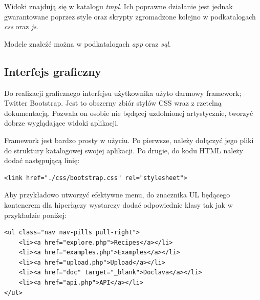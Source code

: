 \documentclass[11pt,a4paper,polish,thesis]{dcsbook}
\begin{document}
Widoki znajdują się w katalogu \emph{tmpl}. Ich poprawne działanie jest jednak gwarantowane poprzez style oraz skrypty zgromadzone kolejno w podkatalogach
\emph{css} oraz \emph{js}.

Modele znaleźć można w podkatalogach \emph{app} oraz \emph{sql}.

\subsection{Interfejs graficzny}
Do realizacji graficznego interfejsu użytkownika użyto darmowy framework; Twitter Bootstrap. Jest to obszerny zbiór stylów CSS wraz z rzetelną dokumentacją. Pozwala on
osobie nie będącej uzdolnionej artystycznie, tworzyć dobrze wyglądające widoki aplikacji.

Framework jest bardzo prosty w użyciu. Po pierwsze, należy dołączyć jego pliki do struktury katalogowej swojej aplikacji. Po drugie, do kodu HTML należy dodać
następującą linię:
\begin{verbatim}
<link href="./css/bootstrap.css" rel="stylesheet">
\end{verbatim}

Aby przykładowo utworzyć efektywne menu, do znacznika UL będącego kontenerem dla hiperłączy wystarczy dodać odpowiednie klasy tak jak w przykładzie poniżej:
\begin{verbatim}
<ul class="nav nav-pills pull-right">
	<li><a href="explore.php">Recipes</a></li>
	<li><a href="examples.php">Examples</a></li>
	<li><a href="upload.php">Upload</a></li>
	<li><a href="doc" target="_blank">Doclava</a></li>
	<li><a href="api.php">API</a></li>
</ul>
\end{verbatim}
\end{document}
